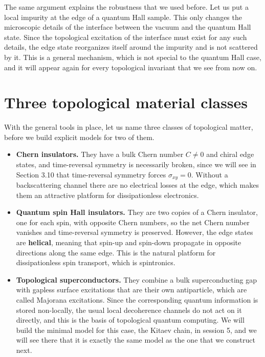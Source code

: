 

The same argument explains the robustness that we used before. Let us put a local impurity at the
edge of a quantum Hall sample. This only changes the microscopic details of the interface between the
vacuum and the quantum Hall state. Since the topological excitation of the interface must exist for
any such details, the edge state reorganizes itself around the impurity and is not scattered by it.
This is a general mechanism, which is not special to the quantum Hall case, and it will appear again
for every topological invariant that we see from now on.

\section{Three topological material classes}

With the general tools in place, let us name three classes of topological matter, before we build
explicit models for two of them.

\begin{itemize}
\item \textbf{Chern insulators.} They have a bulk Chern number $C \neq 0$ and chiral edge states, and
  time-reversal symmetry is necessarily broken, since we will see in Section 3.10 that time-reversal
  symmetry forces $\sigma_{xy}=0$. Without a backscattering channel there are no electrical losses at
  the edge, which makes them an attractive platform for dissipationless electronics.
\item \textbf{Quantum spin Hall insulators.} They are two copies of a Chern insulator, one for each
  spin, with opposite Chern numbers, so the net Chern number vanishes and time-reversal symmetry is
  preserved. However, the edge states are \textbf{helical}, meaning that spin-up and spin-down
  propagate in opposite directions along the same edge. This is the natural platform for
  dissipationless spin transport, which is spintronics.
\item \textbf{Topological superconductors.} They combine a bulk superconducting gap with gapless
  surface excitations that are their own antiparticle, which are called Majorana excitations. Since
  the corresponding quantum information is stored non-locally, the usual local decoherence channels
  do not act on it directly, and this is the basis of topological quantum computing. We will build
  the minimal model for this case, the Kitaev chain, in session 5, and we will see there that it is
  exactly the same model as the one that we construct next.
\end{itemize}

